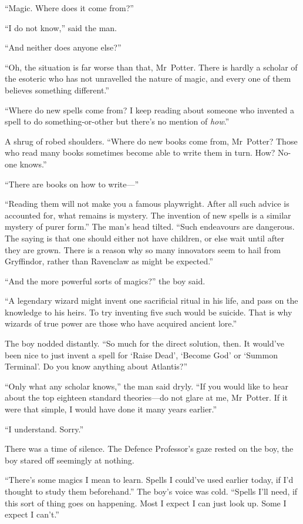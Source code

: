 “Magic. Where does it come from?”

“I do not know,” said the man.

“And neither does anyone else?”

“Oh, the situation is far worse than that, Mr~Potter. There is hardly a scholar of the esoteric who has not unravelled the nature of magic, and every one of them believes something different.”

“Where do new spells come from? I keep reading about someone who invented a spell to do something-or-other but there’s no mention of \emph{how}.”

A shrug of robed shoulders. “Where do new books come from, Mr~Potter? Those who read many books sometimes become able to write them in turn. How? No-one knows.”

“There are books on how to write—”

“Reading them will not make you a famous playwright. After all such advice is accounted for, what remains is mystery. The invention of new spells is a similar mystery of purer form.” The man’s head tilted. “Such endeavours are dangerous. The saying is that one should either not have children, or else wait until after they are grown. There is a reason why so many innovators seem to hail from Gryffindor, rather than Ravenclaw as might be expected.”

“And the more powerful sorts of magics?” the boy said.

“A legendary wizard might invent one sacrificial ritual in his life, and pass on the knowledge to his heirs. To try inventing five such would be suicide. That is why wizards of true power are those who have acquired ancient lore.”

The boy nodded distantly. “So much for the direct solution, then. It would’ve been nice to just invent a spell for ‘Raise Dead’, ‘Become God’ or ‘Summon Terminal’. Do you know anything about Atlantis?”

“Only what any scholar knows,” the man said dryly. “If you would like to hear about the top eighteen standard theories—do not glare at me, Mr~Potter. If it were that simple, I would have done it many years earlier.”

“I understand. Sorry.”

There was a time of silence. The Defence Professor’s gaze rested on the boy, the boy stared off seemingly at nothing.

“There’s some magics I mean to learn. Spells I could’ve used earlier today, if I’d thought to study them beforehand.” The boy’s voice was cold. “Spells I’ll need, if this sort of thing goes on happening. Most I expect I can just look up. Some I expect I can’t.”

